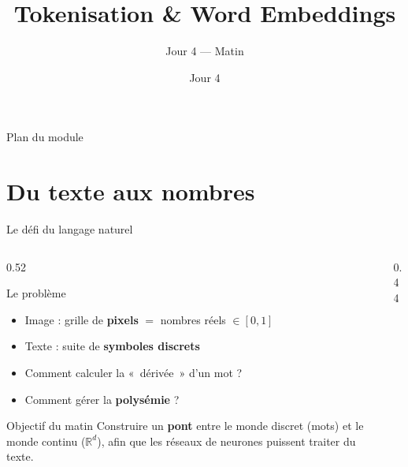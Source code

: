 \documentclass[aspectratio=169, 10pt]{beamer}
\title[Embeddings]{Tokenisation \& Word Embeddings}
\subtitle{Jour 4 --- Matin}
\date{Jour 4}
\begin{document}

\begin{frame}
  \titlepage
\end{frame}

\begin{frame}{Plan du module}
  \tableofcontents
\end{frame}

\section{Du texte aux nombres}

\begin{frame}{Le défi du langage naturel}
  \begin{columns}[T]
    \begin{column}{0.52\textwidth}
      \begin{alertblock}{Le problème}
        \begin{itemize}
          \item Image : grille de \textbf{pixels} $=$ nombres réels $\in [0,1]$
          \item Texte : suite de \textbf{symboles discrets}
          \item Comment calculer la «~dérivée~» d'un mot ?
          \item Comment gérer la \textbf{polysémie} ?
        \end{itemize}
      \end{alertblock}
      \smallskip
      \begin{exampleblock}{Objectif du matin}
        Construire un \textbf{pont} entre le monde discret (mots)
        et le monde continu ($\mathbb{R}^d$), afin que les
        réseaux de neurones puissent traiter du texte.
      \end{exampleblock}
    \end{column}
    \begin{column}{0.44\textwidth}
      \centering
\end{column}
\end{columns}
\end{frame}
\end{document}
